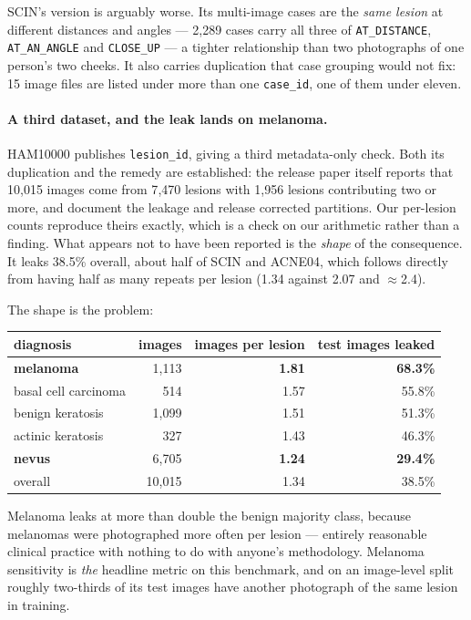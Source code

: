 \documentclass[11pt]{article}
\begin{document}
SCIN's version is arguably worse. Its multi-image cases are the \emph{same lesion} at
different distances and angles --- 2{,}289 cases carry all three of \texttt{AT\_DISTANCE},
\texttt{AT\_AN\_ANGLE} and \texttt{CLOSE\_UP} --- a tighter relationship than two
photographs of one person's two cheeks. It also carries duplication that case grouping
would not fix: 15 image files are listed under more than one \texttt{case\_id}, one of them
under eleven.

\paragraph{A third dataset, and the leak lands on melanoma.}
HAM10000 publishes \texttt{lesion\_id}, giving a third metadata-only check. Both its
duplication and the remedy are established: the release paper itself reports that 10{,}015
images come from 7{,}470 lesions with 1{,}956 lesions contributing two or more, and
\citet{fitzpatrick_audit2024} document the leakage and release corrected partitions. Our
per-lesion counts reproduce theirs exactly, which is a check on our arithmetic rather than a
finding. What appears not to have been reported is the \emph{shape} of the consequence. It leaks 38.5\% overall, about half of SCIN and ACNE04, which follows directly
from having half as many repeats per lesion (1.34 against 2.07 and $\approx$2.4).

The shape is the problem:

\begin{center}
\begin{tabular}{lrrr}
\toprule
diagnosis & images & images per lesion & test images leaked \\
\midrule
\textbf{melanoma} & 1{,}113 & \textbf{1.81} & \textbf{68.3\%} \\
basal cell carcinoma & 514 & 1.57 & 55.8\% \\
benign keratosis & 1{,}099 & 1.51 & 51.3\% \\
actinic keratosis & 327 & 1.43 & 46.3\% \\
\textbf{nevus} & 6{,}705 & \textbf{1.24} & \textbf{29.4\%} \\
\midrule
overall & 10{,}015 & 1.34 & 38.5\% \\
\bottomrule
\end{tabular}
\end{center}

Melanoma leaks at more than double the benign majority class, because melanomas were
photographed more often per lesion --- entirely reasonable clinical practice with nothing
to do with anyone's methodology. Melanoma sensitivity is \emph{the} headline metric on this
benchmark, and on an image-level split roughly two-thirds of its test images have another
photograph of the same lesion in training.
\end{document}
